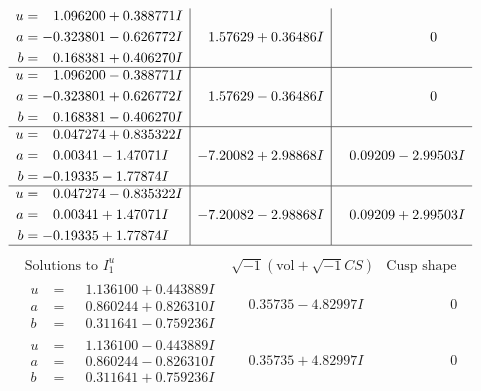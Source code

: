 \documentclass[1p]{elsarticle_modified}
\theoremstyle{definition}
\newcommand{\I}{\sqrt{-1}}
\begin{document}
$$\begin{array}{c|c|c}
\begin{aligned}
u &= \phantom{-}1.096200 + 0.388771 I \\
a &= -0.323801 - 0.626772 I \\
b &= \phantom{-}0.168381 + 0.406270 I\end{aligned}
 & \phantom{-}1.57629 + 0.36486 I & \phantom{-0.000000 } 0 \\ \hline\begin{aligned}
u &= \phantom{-}1.096200 - 0.388771 I \\
a &= -0.323801 + 0.626772 I \\
b &= \phantom{-}0.168381 - 0.406270 I\end{aligned}
 & \phantom{-}1.57629 - 0.36486 I & \phantom{-0.000000 } 0 \\ \hline\begin{aligned}
u &= \phantom{-}0.047274 + 0.835322 I \\
a &= \phantom{-}0.00341 - 1.47071 I \\
b &= -0.19335 - 1.77874 I\end{aligned}
 & -7.20082 + 2.98868 I & \phantom{-}0.09209 - 2.99503 I \\ \hline\begin{aligned}
u &= \phantom{-}0.047274 - 0.835322 I \\
a &= \phantom{-}0.00341 + 1.47071 I \\
b &= -0.19335 + 1.77874 I\end{aligned}
 & -7.20082 - 2.98868 I & \phantom{-}0.09209 + 2.99503 I\\
 \hline 
 \end{array}$$\newpage$$\begin{array}{c|c|c}  
\text{Solutions to }I^u_{1}& \I (\text{vol} + \sqrt{-1}CS) & \text{Cusp shape}\\
 \hline 
\begin{aligned}
u &= \phantom{-}1.136100 + 0.443889 I \\
a &= \phantom{-}0.860244 + 0.826310 I \\
b &= \phantom{-}0.311641 - 0.759236 I\end{aligned}
 & \phantom{-}0.35735 - 4.82997 I & \phantom{-0.000000 } 0 \\ \hline\begin{aligned}
u &= \phantom{-}1.136100 - 0.443889 I \\
a &= \phantom{-}0.860244 - 0.826310 I \\
b &= \phantom{-}0.311641 + 0.759236 I\end{aligned}
 & \phantom{-}0.35735 + 4.82997 I & \phantom{-0.000000 } 0 \\ \hline\begin{aligned}

\end{aligned}
\end{array}$$
\end{document}
